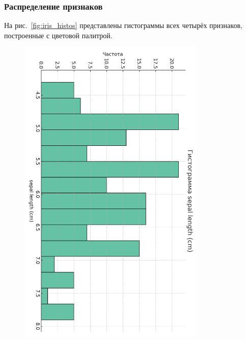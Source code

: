 \subsubsection{Распределение признаков}

На рис.~\ref{fig:iris_histos} представлены гистограммы всех четырёх признаков, построенные с цветовой палитрой.
\begin{figure}[H]
  \centering
  \includegraphics[width=0.8\textwidth]{images/histo_sepal_length_cm_cb2.png}\\[6pt]

\end{figure}
